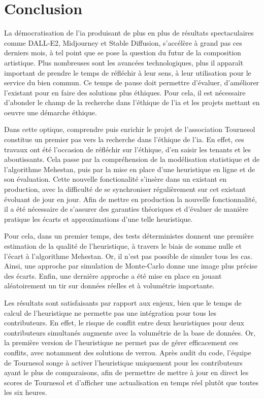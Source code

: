 \section{Conclusion}

La démocratisation de l'\gls{ia} produisant de plus en plus de résultats spectaculaires comme DALL-E2, Midjourney et Stable Diffusion, s'accélère à grand pas ces derniers mois, à tel point que se pose la question du futur de la composition artistique. Plus nombreuses sont les avancées technologiques, plus il apparaît important de prendre le temps de réfléchir à leur sens, à leur utilisation pour le service du bien commun. Ce temps de pause doit permettre d'évaluer, d'améliorer l'existant pour en faire des solutions plus éthiques. Pour cela, il est nécessaire d'abonder le champ de la recherche dans l'éthique de l'\gls{ia} et les projets mettant en oeuvre une démarche éthique.

Dans cette optique, comprendre puis enrichir le projet de l'association Tournesol constitue un premier pas vers la recherche dans l'éthique de l'\gls{ia}. En effet, ces travaux ont été l'occasion de réfléchir sur l'éthique, d'en saisir les tenants et les aboutissants. Cela passe par la compréhension de la modélisation statistique et de l'algorithme Mehestan, puis par la mise en place d'une heuristique en ligne et de son évaluation. Cette nouvelle fonctionalité s'insère dans un existant en production, avec la difficulté de se synchroniser régulièrement sur cet existant évoluant de jour en jour. 
Afin de mettre en production la nouvelle fonctionnalité, il a été nécessaire de s'assurer des garanties théoriques et d'évaluer de manière pratique les écarts et approximations d'une telle heuristique.

Pour cela, dans un premier temps, des tests déterministes donnent une première estimation de la qualité de l'heuristique, à travers le biais de somme nulle et l'écart à l'algorithme Mehestan. Or, il n'est pas possible de simuler tous les cas. Ainsi, une approche par simulation de Monte-Carlo donne une image plus précise des écarts. Enfin, une dernière approche a été mise en place en jouant aléatoirement un tir sur données réelles et à volumétrie importante.

Les résultats sont satisfaisants par rapport aux enjeux, bien que le temps de calcul de l'heuristique ne permette pas une intégration pour tous les contributeurs. En effet, le risque de conflit entre deux heuristiques pour deux contributeurs simultanés augmente avec la volumétrie de la base de données. Or, la première version de l'heuristique ne permet pas de gérer efficacement ces conflits, avec notamment des solutions de verrou. Après audit du code, l'équipe de Tournesol songe à activer l'heuristique uniquement pour les contributeurs ayant le plus de comparaisons, afin de permettre de mettre à jour en direct les scores de Tournesol et d'afficher une actualisation en temps réel plutôt que toutes les six heures.
\pagebreak